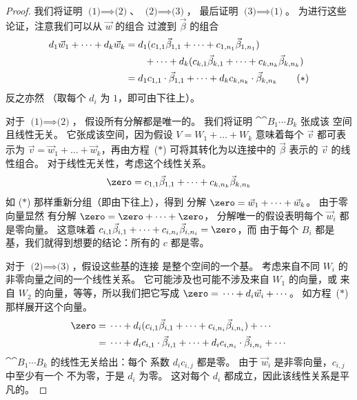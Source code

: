 \begin{proof}
我们将证明 $\text{(1)}\implies\text{(2)}$、
$\text{(2)}\implies\text{(3)}$，
最后证明 $\text{(3)}\implies\text{(1)}$。
为进行这些论证，注意我们可以从 $\vec{w}$ 的组合
过渡到 $\vec{\beta}$ 的组合
\begin{align*}
  d_1\vec{w}_1+\dots+d_k\vec{w}_k
    &= d_1(c_{1,1}\vec{\beta}_{1,1}+\dots+c_{1,n_1}\vec{\beta}_{1,n_1})   \\
    &\qquad\hbox{}+\dots
        +d_k(c_{k,1}\vec{\beta}_{k,1}+\dots+c_{k,n_k}\vec{\beta}_{k,n_k}) \\
    &= d_1c_{1,1}\cdot\vec{\beta}_{1,1}
        +\dots
        +d_kc_{k,n_k}\cdot\vec{\beta}_{k,n_k}
  \tag{$*$}
\end{align*}
反之亦然
（取每个 $d_i$ 为 $1$，即可由下往上）。

对于 $\text{(1)}\implies\text{(2)}$，
假设所有分解都是唯一的。
我们将证明 $\cat{\cat{B_1}{\cdots}}{B_k}$ 张成该
空间且线性无关。
它张成该空间，因为假设
$V=W_1+\dots+W_k$
意味着每个 $\vec{v}$ 都可表示为
$\vec{v}=\vec{w}_1+\dots+\vec{w}_k$，再由方程~($*$) 可将其转化为以连接中的 $\vec{\beta}$
表示的 $\vec{v}$ 的线性组合。
对于线性无关性，考虑这个线性关系。
\begin{equation*}
  \zero=c_{1,1}\vec{\beta}_{1,1}+\dots+c_{k,n_k}\vec{\beta}_{k,n_k}
\end{equation*}
如 ($*$) 那样重新分组（即由下往上），得到
分解 $\zero=\vec{w}_1+\dots+\vec{w}_k$。
由于零向量显然
有分解 $\zero=\zero+\dots+\zero$，
分解唯一的假设表明每个
$\vec{w}_i$ 都是零向量。
这意味着
$c_{i,1}\vec{\beta}_{i,1}+\dots+c_{i,n_i}\vec{\beta}_{i,n_i}=\zero$，而
由于每个 $B_i$ 都是基，我们就得到想要的结论：所有的
$c$ 都是零。

对于 $\text{(2)}\implies\text{(3)}$，假设这些基的连接
是整个空间的一个基。
考虑来自不同
$W_i$ 的非零向量之间的一个线性关系。
它可能涉及也可能不涉及来自 $W_1$ 的向量，或
来自 $W_2$ 的向量，等等，所以我们把它写成
$\zero=\mbox{}\cdots+d_i\vec{w}_i+\cdots\mbox{}$。
如方程~($*$) 那样展开这个向量。
\begin{align*}
  \zero
   &= \mbox{}\dots
      +d_i(c_{i,1}\vec{\beta}_{i,1}+\dots+c_{i,n_i}\vec{\beta}_{i,n_i})
      +\cdots\mbox{}                                               \\
   &= \mbox{}\dots
      +d_ic_{i,1}\cdot\vec{\beta}_{i,1}
      +\dots+
      d_ic_{i,n_i}\cdot\vec{\beta}_{i,n_i}
      +\cdots\mbox{}
\end{align*}
$\cat{\cat{B_1}{\cdots}}{B_k}$ 的线性无关给出：每个
系数 $d_ic_{i,j}$ 都是零。
由于 $\vec{w}_i$ 是非零向量，$c_{i,j}$ 中至少有一个
不为零，于是 $d_i$ 为零。
这对每个 $d_i$ 都成立，因此该线性关系是平凡的。


\end{proof}
